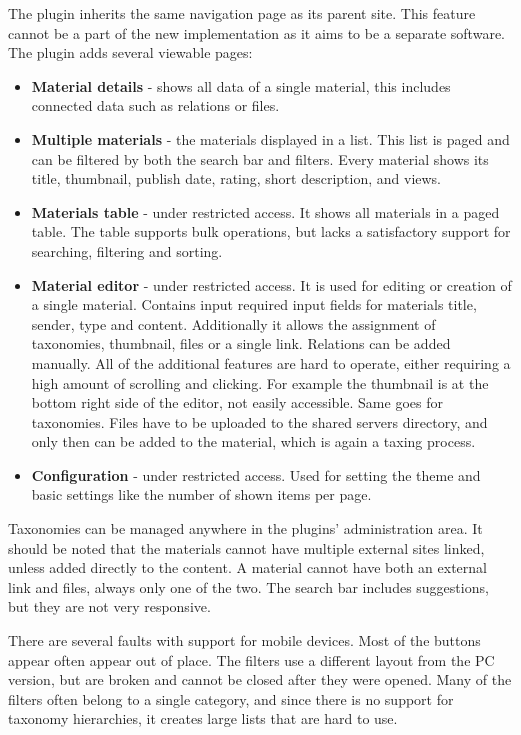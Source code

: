 \documentclass[
  digital,     %
  oneside,     %
  nosansbold,  %
  colorbold, %
  lof,         %
  lot,         %
]{fithesis4}
\begin{document}
The plugin inherits the same navigation page as its parent site. This feature cannot be a part of the new implementation as it aims to be a separate software. The plugin adds several viewable pages: \begin{itemize}
	\item \textbf{Material details} - shows all data of a single material, this includes connected data such as relations or files.
	\item \textbf{Multiple materials} - the materials displayed in a list. This list is paged and can be filtered by both the search bar and filters. Every material shows its title, thumbnail, publish date, rating, short description, and views. 
	\item \textbf{Materials table} - under restricted access. It shows all materials in a paged table. The table supports bulk operations, but lacks a satisfactory support for searching, filtering and sorting.
	\item \textbf{Material editor} - under restricted access. It is used for editing or creation of a single material. Contains input required input fields for materials title, sender, type and content. Additionally it allows the assignment of taxonomies, thumbnail, files or a single link. Relations can be added manually. All of the additional features are hard to operate, either requiring a high amount of scrolling and clicking. For example the thumbnail is at the bottom right side of the editor, not easily accessible. Same goes for taxonomies. Files have to be uploaded to the shared servers directory, and only then can be added to the material, which is again a taxing process.
	\item \textbf{Configuration} - under restricted access. Used for setting the theme and basic settings like the number of shown items per page.
\end{itemize}

Taxonomies can be managed anywhere in the plugins' administration area. It should be noted that the materials cannot have multiple external sites linked, unless added directly to the content. A material cannot have both an external link and files, always only one of the two. The search bar includes suggestions, but they are not very responsive.

There are several faults with support for mobile devices. Most of the buttons appear often appear out of place. The filters use a different layout from the PC version, but are broken and cannot be closed after they were opened. Many of the filters often belong to a single category, and since there is no support for taxonomy hierarchies, it creates large lists that are hard to use.
\end{document}
